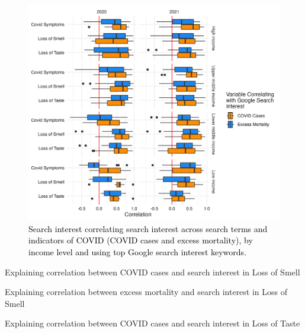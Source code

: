 \documentclass{article}
\begin{document}
\begin{figure}[H]
    \includegraphics[width=1\textwidth]{figures/cases_excess_boxplot_income.png}
    \caption{\textcolor{black}{Search interest correlating search interest across search terms and indicators of COVID (COVID cases and excess mortality), by income level and using top Google search interest keywords.}}
    \label{fig:cases_excess_boxplot_income}
\end{figure}



\begin{table}[H]
\caption{Explaining correlation between COVID cases and search interest in Loss of Smell}
\label{tab:lm_cor_cases_monthly_loss_of_smell}
\centering

\end{table}

\begin{table}[H]
\caption{Explaining correlation between excess mortality and search interest in Loss of Smell}
\label{tab:lm_cor_excess_monthly_loss_of_smell}
\centering

\end{table}

\begin{table}[H]
\caption{Explaining correlation between COVID cases and search interest in Loss of Taste}
\label{tab:lm_cor_cases_monthly_loss_of_taste}
\centering

\end{table}
\end{document}
